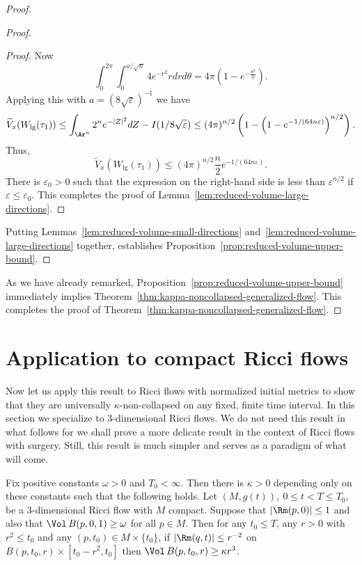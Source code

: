 \begin{proof}
\begin{proof}
\begin{proof}
Now
$$\int_0^{2\pi}\int_0^{a/\sqrt{n}}4e^{-r^2}rdrd\theta=4\pi(1-e^{-\frac{a^2}{n}}).$$
Applying this with $a=(8\sqrt\varepsilon)^{-1}$ we have
$$\widetilde V_x(W_{\mathrm{lg}}(\tau_1))\le \int_{\Ar^n}2^ne^{-|Z|^2}dZ-I(1/8\sqrt\varepsilon)
\le(4\pi)^{n/2}\left(1-\left(1-e^{-1/(64n\varepsilon)}\right)^{n/2}\right).$$
Thus,
$$\widetilde V_x(W_{\mathrm{lg}}(\tau_1))\le
(4\pi)^{n/2}\frac{n}{2}e^{-1/(64n\varepsilon)}.$$ There is $\varepsilon_0>0$ such that the expression on the
right-hand side is less than $\varepsilon^{n/2}$ if $\varepsilon\le
\varepsilon_0$. This completes the proof of Lemma~\ref{lem:reduced-volume-large-directions}.
\end{proof}



Putting Lemmas~\ref{lem:reduced-volume-small-directions} and~\ref{lem:reduced-volume-large-directions} together, establishes
Proposition~\ref{prop:reduced-volume-upper-bound}. \end{proof}

As we have already remarked, Proposition~\ref{prop:reduced-volume-upper-bound} immediately
implies Theorem~\ref{thm:kappa-noncollapsed-generalized-flow}. This completes the proof of
Theorem~\ref{thm:kappa-noncollapsed-generalized-flow}.
\end{proof}



\section{Application to compact Ricci flows}

Now let us apply this result to Ricci flows with normalized initial
metrics to show that they are universally $\kappa$-non-collapsed on
any fixed, finite time interval. In this section we specialize to
$3$-dimensional Ricci flows. We do not need this result in what
follows for we shall prove a more delicate result in the context of
Ricci flows with surgery. Still, this result is much simpler and
serves as a paradigm of what will come.

\begin{theorem}\label{thm:kappa-noncollapsed-compact-3-manifolds}
Fix positive constants $\omega>0$ and $T_0<\infty$. Then there is
$\kappa>0$ depending only on these constants such that the following
holds. Let $(M,g(t)),\ 0\le t<T\le T_0$, be a $3$-dimensional Ricci
flow with $M$ compact. Suppose that $|\Rm(p,0)|\le 1$ and also
that $\Vol\,B(p,0,1)\ge \omega$ for all $p\in M$. Then for any
$t_0\le T$, any  $r>0$ with $r^2\le t_0$ and any $(p,t_0)\in M\times
\{t_0\}$, if $|\Rm(q,t)|\le r^{-2}$ on $B(p,t_0,r)\times
[t_0-r^2,t_0]$ then $\Vol\,B(p,t_0,r)\ge \kappa r^3$.
\end{theorem}


